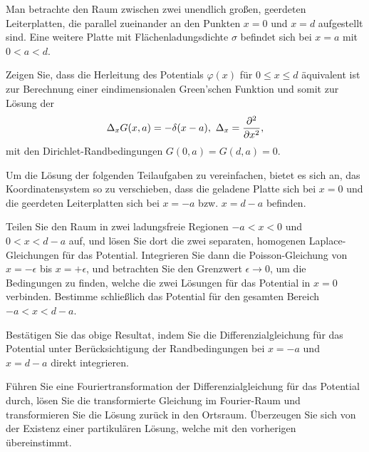 \begin{Problem}
Man betrachte den Raum zwischen zwei unendlich großen, geerdeten Leiterplatten, die parallel zueinander an den Punkten $x = 0$ und $x = d$ aufgestellt sind. Eine weitere Platte mit Flächenladungsdichte $\sigma$ befindet sich bei $x = a$ mit $0 < a < d$.
\begin{parts}
\item Zeigen Sie, dass die Herleitung des Potentials $\varphi(x)$ f\"{u}r $0\le x \le d$ \"{a}quivalent ist zur Berechnung einer eindimensionalen Green’schen Funktion und somit zur Lösung der
\[
\Delta_x G(x,a)=-\delta(x-a),~\Delta_x=\pdv[2]{x}
,\]
mit den Dirichlet-Randbedingungen $G(0,a)=G(d,a)=0$.

Um die Lösung der folgenden Teilaufgaben zu vereinfachen, bietet es sich an, das Koordinatensystem so zu verschieben, dass die geladene Platte sich bei $x = 0$ und die geerdeten Leiterplatten sich bei $x = -a$ bzw. $x = d - a$ befinden.
\item Teilen Sie den Raum in zwei ladungsfreie Regionen $-a < x < 0$ und $0 < x < d - a$ auf, und lösen Sie dort die zwei separaten, homogenen Laplace-Gleichungen für das Potential. Integrieren Sie dann die Poisson-Gleichung von $x = -\epsilon$ bis $x = +\epsilon$, und betrachten Sie den Grenzwert $\epsilon\to 0$, um die Bedingungen zu finden, welche die zwei Lösungen für das Potential in $x = 0$ verbinden. Bestimme schließlich das Potential für den gesamten Bereich $-a < x < d - a$.
\item Bestätigen Sie das obige Resultat, indem Sie die Differenzialgleichung für das Potential unter Berücksichtigung der Randbedingungen bei $x = -a$ und $x = d - a$ direkt integrieren. 
\item Führen Sie eine Fouriertransformation der Differenzialgleichung für das Potential durch, lösen Sie die transformierte Gleichung im Fourier-Raum und transformieren Sie die Lösung zurück in den Ortsraum. Überzeugen Sie sich von der Existenz einer partikulären Lösung, welche mit den vorherigen übereinstimmt. 
\end{parts}
\end{Problem}

